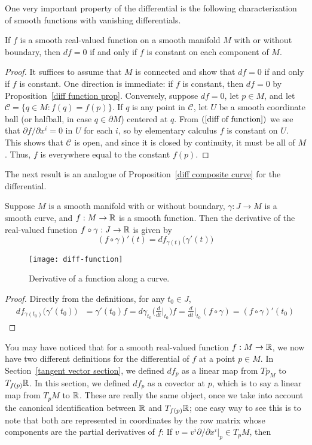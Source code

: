 One very important property of the differential is the following characterization
of smooth functions with vanishing differentials.
\begin{proposition}\label{diff vanish}
If $f$ is a smooth real-valued function on a smooth manifold $M$ with or without boundary, then $df=0$ if and only if $f$ is constant on each component of $M$.
\end{proposition}
\begin{proof}
It suffices to assume that $M$ is connected and show that $df=0$ if and only if
$f$ is constant. One direction is immediate: if $f$ is constant, then $df=0$ by Proposition~\ref{diff function prop}. Conversely, suppose $df=0$, let $p\in M$, and let $\mathscr{C}=\{q\in M:f(q)=f(p)\}$. If $q$ is any point in $\mathscr{C}$, let $U$ be a smooth coordinate ball (or halfball, in case $q\in\partial M$) centered at $q$. From $(\ref{diff of function})$ we see that $\partial f/\partial x^i=0$ in $U$ for each $i$, so by elementary calculus $f$ is constant on $U$. This shows that $\mathscr{C}$ is open, and since it is closed by continuity, it must be all of $M$. Thus, $f$ is everywhere equal to the constant $f(p)$.
\end{proof}
The next result is an analogue of Proposition~\ref{diff composite curve} for the differential.
\begin{proposition}\label{diff function curve}
Suppose $M$ is a smooth manifold with or without boundary, $\gamma:J\to M$ is a smooth curve, and $f:M\to\mathbb{R}$ is a smooth function. Then the derivative of the real-valued function $f\circ\gamma:J\to\mathbb{R}$ is given by
\[(f\circ\gamma)'(t)=df_{\gamma(t)}\big(\gamma'(t)\big)\]
\end{proposition}
\begin{figure}[htbp]
\centering
\texttt{[image: diff-function]}
\caption{Derivative of a function along a curve.}
\end{figure}
\begin{proof}
Directly from the definitions, for any $t_0\in J$,
\begin{align*}
df_{\gamma(t_0)}\big(\gamma'(t_0)\big)&=\gamma'(t_0)f=d\gamma_{t_0}\Big(\frac{d}{dt}\Big|_{t_0}\Big)f=\frac{d}{dt}\Big|_{t_0}(f\circ\gamma)=(f\circ\gamma)'(t_0)
\end{align*}
\end{proof}
You may have noticed that for a smooth real-valued function $f:M\to\mathbb{R}$, we now have two different definitions for the differential of $f$ at a point $p\in M$. In Section~\ref{tangent vector section}, we defined $df_p$ as a linear map from $Tp_M$ to $T_{f(p)}\mathbb{R}$. In this section, we defined $df_p$ as a covector at $p$, which is to say a linear map from $T_pM$ to $\mathbb{R}$. These are really the same object, once we take into account the canonical identification between $\mathbb{R}$ and $T_{f(p)}\mathbb{R}$; one easy way to see this is to note that both are represented in coordinates by the row matrix whose components are the partial derivatives of $f$: If $v=v^i\partial/\partial x^i|_p\in T_pM$, then
